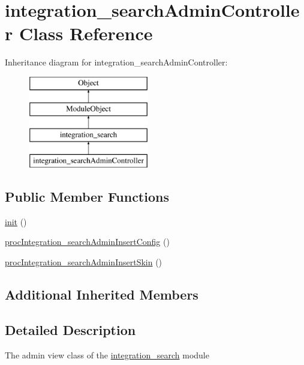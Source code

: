 \hypertarget{classintegration__searchAdminController}{}\section{integration\+\_\+search\+Admin\+Controller Class Reference}
\label{classintegration__searchAdminController}
Inheritance diagram for integration\+\_\+search\+Admin\+Controller\+:\begin{figure}[H]
\begin{center}
\leavevmode
\includegraphics[height=4.000000cm]{classintegration__searchAdminController}
\end{center}
\end{figure}
\subsection*{Public Member Functions}
\begin{DoxyCompactItemize}
\item 
\hyperlink{classintegration__searchAdminController_af0bce7d6e800c43283d7ed9d59129888}{init} ()
\item 
\hyperlink{classintegration__searchAdminController_aa5f35f169a96654f8fd8b9d824479693}{proc\+Integration\+\_\+search\+Admin\+Insert\+Config} ()
\item 
\hyperlink{classintegration__searchAdminController_a5bd4a4873fc65c94684beea688448f45}{proc\+Integration\+\_\+search\+Admin\+Insert\+Skin} ()
\end{DoxyCompactItemize}
\subsection*{Additional Inherited Members}


\subsection{Detailed Description}
The admin view class of the \hyperlink{classintegration__search}{integration\+\_\+search} module

